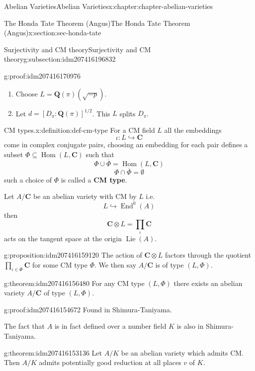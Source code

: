 \documentclass[oneside,10pt,]{book}
\newcommand{\terminology}[1]{\textbf{#1}}
\numberwithin{equation}{section}
\DeclareMathOperator{\Lie}{Lie}
\newcommand{\lb}{[}
\newcommand{\rb}{]}
\newcommand{\QQ}{\mathbf{Q}}
\newcommand{\CC}{\mathbf{C}}
\DeclareMathOperator{\End}{End}
\DeclareMathOperator{\Hom}{Hom}
\begin{document}
\begin{chapterptx}{Abelian Varieties}{}{Abelian Varieties}{}{}{x:chapter:chapter-abelian-varieties}
\begin{sectionptx}{The Honda Tate Theorem (Angus)}{}{The Honda Tate Theorem (Angus)}{}{}{x:section:sec-honda-tate}
\begin{subsectionptx}{Surjectivity and CM theory}{}{Surjectivity and CM theory}{}{}{g:subsection:idm207416196832}
\begin{proofptx}{}{g:proof:idm207416170976}
\begin{enumerate}
\item{}Choose \(L = \QQ(\pi)(\sqrt{-p})\).%
\item{}Let \(d= \lb D_\pi: \QQ(\pi)\rb^{1/2}\). This \(L\) splits \(D_\pi\).%
\end{enumerate}
%
\end{proofptx}
\begin{definition}{CM types.}{x:definition:def-cm-type}%
For a CM field \(L\) all the embeddings%
\begin{equation*}
\iota\colon L \hookrightarrow \CC
\end{equation*}
come in complex conjugate pairs, choosing an embedding for each pair defines a subset \(\Phi\subseteq \Hom(L, \CC)\) such that%
\begin{equation*}
\Phi \cup \overline \Phi = \Hom(L,\CC)
\end{equation*}
%
\begin{equation*}
\Phi \cap \overline \Phi = \emptyset
\end{equation*}
such a choice of \(\Phi \) is called a \terminology{CM type}.%
\end{definition}
Let \(A/\CC\) be an abelian variety with CM by \(L\) i.e.%
\begin{equation*}
L\hookrightarrow \End^0(A)
\end{equation*}
then%
\begin{equation*}
\CC\otimes L = \prod_\iota \CC
\end{equation*}
acts on the tangent space at the origin \(\Lie(A)\).%
\begin{proposition}{}{}{g:proposition:idm207416159120}%
The action of \(\CC\otimes L\) factors through the quotient \(\prod_{\iota\in \Phi} \CC\) for some CM type \(\Phi\). We then say \(A/\CC\) is of type \((L,\Phi)\).%
\end{proposition}
\begin{theorem}{}{}{g:theorem:idm207416156480}%
For any CM type \((L,\Phi)\) there exists an abelian variety \(A/\CC\) of type \((L, \Phi)\).%
\end{theorem}
\begin{proofptx}{}{g:proof:idm207416154672}
Found in Shimura-Taniyama.%
\end{proofptx}
The fact that \(A\) is in fact defined over  a number field \(K\) is also in Shimura-Taniyama.%
\begin{theorem}{}{}{g:theorem:idm207416153136}%
Let \(A/K\) be an abelian variety which admits CM. Then \(A/K\) admits potentially good reduction at all places \(v\) of \(K\).%

\end{theorem}
\end{subsectionptx}
\end{sectionptx}
\end{chapterptx}
\end{document}
